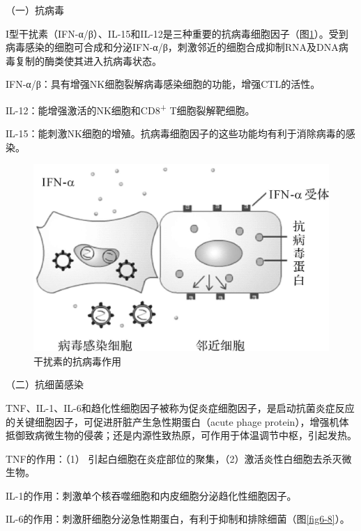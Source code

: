 （一）抗病毒

I型干扰素（IFN-α/β）、IL-15和IL-12是三种重要的抗病毒细胞因子（图\ref{fig6-7}）。受到病毒感染的细胞可合成和分泌IFN-α/β，刺激邻近的细胞合成抑制RNA及DNA病毒复制的酶类使其进入抗病毒状态。

IFN-α/β：具有增强NK细胞裂解病毒感染细胞的功能，增强CTL的活性。

IL-12：能增强激活的NK细胞和CD8\textsuperscript{+} T细胞裂解靶细胞。

IL-15：能刺激NK细胞的增殖。抗病毒细胞因子的这些功能均有利于消除病毒的感染。

\begin{figure}[!htbp]
 \centering
 \includegraphics{./images/Image00097.jpg}
 \captionsetup{justification=centering}
 \caption{干扰素的抗病毒作用}
 \label{fig6-7}
  \end{figure} 

（二）抗细菌感染

TNF、IL-1、IL-6和趋化性细胞因子被称为促炎症细胞因子，是启动抗菌炎症反应的关键细胞因子，可促进肝脏产生急性期蛋白（acute
phage
protein），增强机体抵御致病微生物的侵袭；还是内源性致热原，可作用于体温调节中枢，引起发热。

TNF的作用：（1）
引起白细胞在炎症部位的聚集，（2）激活炎性白细胞去杀灭微生物。

IL-1的作用：刺激单个核吞噬细胞和内皮细胞分泌趋化性细胞因子。

IL-6的作用：刺激肝细胞分泌急性期蛋白，有利于抑制和排除细菌（图\ref{fig6-8}）。

